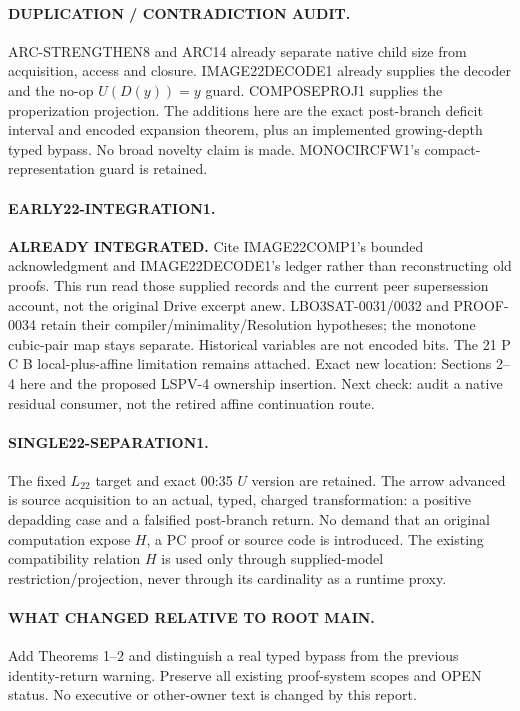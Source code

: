 \documentclass[11pt]{article}
\begin{document}
\paragraph{DUPLICATION / CONTRADICTION AUDIT.}
ARC-STRENGTHEN8 and ARC14 already separate native child size from acquisition,
access and closure. IMAGE22DECODE1 already supplies the decoder and the
no-op $U(D(y))=y$ guard. COMPOSEPROJ1 supplies the properization projection.
The additions here are the exact post-branch deficit interval and encoded
expansion theorem, plus an implemented growing-depth typed bypass. No broad
novelty claim is made. MONOCIRCFW1's compact-representation guard is retained.

\paragraph{EARLY22-INTEGRATION1.}
\textbf{ALREADY INTEGRATED.} Cite IMAGE22COMP1's bounded acknowledgment and
IMAGE22DECODE1's ledger rather than reconstructing old proofs. This run read
those supplied records and the current peer supersession account, not the
original Drive excerpt anew. LBO3SAT-0031/0032 and PROOF-0034 retain their
compiler/minimality/Resolution hypotheses; the monotone cubic-pair map stays
separate. Historical variables are not encoded bits. The 21 P C B
local-plus-affine limitation remains attached. Exact new location: Sections
2--4 here and the proposed LSPV-4 ownership insertion. Next check: audit a
native residual consumer, not the retired affine continuation route.

\paragraph{SINGLE22-SEPARATION1.}
The fixed $L_{22}$ target and exact 00:35 $U$ version are retained. The arrow
advanced is source acquisition to an actual, typed, charged transformation:
a positive depadding case and a falsified post-branch return. No demand that
an original computation expose $H$, a PC proof or source code is introduced.
The existing compatibility relation $H$ is used only through supplied-model
restriction/projection, never through its cardinality as a runtime proxy.

\paragraph{WHAT CHANGED RELATIVE TO ROOT MAIN.}
Add Theorems 1--2 and distinguish a real typed bypass from the previous
identity-return warning. Preserve all existing proof-system scopes and OPEN
status. No executive or other-owner text is changed by this report.
\end{document}
